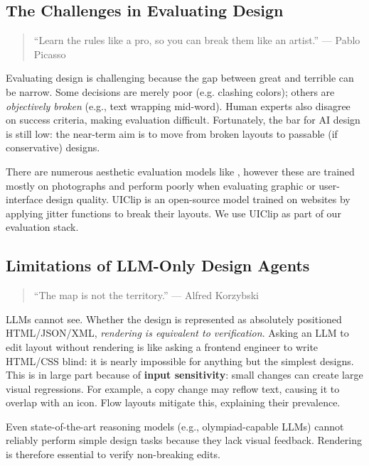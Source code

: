 \documentclass{article}
\begin{document}
\subsection{The Challenges in Evaluating Design}
\begin{quote}
``Learn the rules like a pro, so you can break them like an artist.'' --- Pablo Picasso
\end{quote}

Evaluating design is challenging because the gap between great and terrible can be narrow. Some decisions are merely poor (e.g. clashing colors); others are \emph{objectively broken} (e.g., text wrapping mid-word). Human experts also disagree on success criteria, making evaluation difficult. Fortunately, the bar for AI design is still low: the near-term aim is to move from broken layouts to passable (if conservative) designs.

There are numerous aesthetic evaluation models like \cite{AesExpert}, however these are trained mostly on photographs and perform poorly when evaluating graphic or user-interface design quality. UIClip\cite{wu2024uiclip} is an open-source model trained on websites by applying jitter functions to break their layouts. We use UIClip as part of our evaluation stack.

\subsection{Limitations of LLM-Only Design Agents}

\begin{quote}
``The map is not the territory.'' --- Alfred Korzybski
\end{quote}

LLMs cannot see. Whether the design is represented as absolutely positioned HTML/JSON/XML, \emph{rendering is equivalent to verification}. Asking an LLM to edit layout without rendering is like asking a frontend engineer to write HTML/CSS blind: it is nearly impossible for anything but the simplest designs. This is in large part because of \textbf{input sensitivity}: small changes can create large visual regressions. For example, a copy change may reflow text, causing it to overlap with an icon. Flow layouts mitigate this, explaining their prevalence.

Even state-of-the-art reasoning models (e.g., olympiad-capable LLMs) cannot reliably perform simple design tasks because they lack visual feedback. Rendering is therefore essential to verify non-breaking edits.
\end{document}
